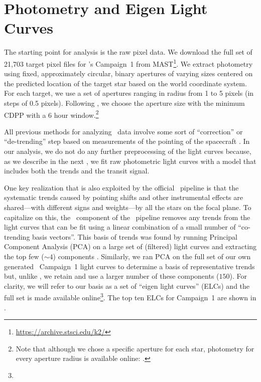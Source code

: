 \section{Photometry and Eigen Light Curves}

The starting point for analysis is the raw pixel data.
We download the full set of 21,703 target pixel files for \KT's Campaign~1
from MAST\footnote{\url{https://archive.stsci.edu/k2/}}.
We extract photometry using fixed, approximately circular, binary apertures of
varying sizes centered on the predicted location of the target star based on
the world coordinate system.
For each target, we use a set of apertures ranging in radius from 1 to 5
pixels (in steps of 0.5 pixels).
Following \citet{Vanderburg:2014}, we choose the aperture size with the
minimum CDPP \citep{Christiansen:2012} with a 6 hour window.\footnote{Note
that although we chose a specific aperture for each star, photometry for every
aperture radius is available online: \datareleaseurl.}

All previous methods for analyzing \KT\ data involve some sort of
``correction'' or ``de-trending'' step based on measurements of the pointing
of the spacecraft \citep{Vanderburg:2014, Aigrain:2015, Crossfield:2015}.
In our analysis, we do not do any further preprocessing of the light curves
because, as we describe in the next \sectionname, we fit raw photometric light
curves with a model that includes both the trends and the transit signal.

One key realization that is also exploited by the official \kepler\ pipeline
is that the systematic trends caused by pointing shifts and other instrumental
effects are shared---with different signs and weights---by all the stars on
the focal plane.
To capitalize on this, the \pdc\ component of the \kepler\ pipeline
removes any trends from the light curves that can be fit using a linear
combination of a small number of ``co-trending basis vectors''.
This basis of trends was found by running Principal Component Analysis (PCA)
on a large set of (filtered) light curves and extracting the top few ($\sim
4$) components \citep{Stumpe:2012, Smith:2012}.
Similarly, we ran PCA on the full set of our own generated \KT\ Campaign~1
light curves to determine a basis of representative trends but, unlike \pdc,
we retain and use a larger number of these components ($150$).
For clarity, we will refer to our basis as a set of ``eigen light curves''
(ELCs) and the full set is made available online\footnote{\datareleaseurl}.
The top ten ELCs for Campaign~1 are shown in .

